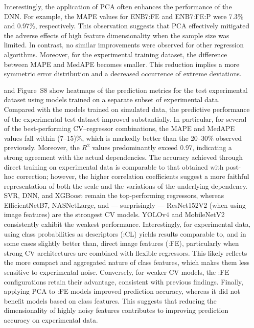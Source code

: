 \documentclass[10pt]{iopart}
\begin{document}
Interestingly, the application of PCA often enhances the performance of the DNN.
For example, the MAPE values for ENB7:FE and ENB7:FE:P were 7.3\% and 0.97\%, respectively.
This observation suggests that PCA effectively mitigated the adverse effects of high feature dimensionality
when the sample size was limited.
In contrast, no similar improvements were observed for other regression algorithms.
Moreover, for the experimental training dataset,
the difference between MAPE and MedAPE becomes smaller.
This reduction implies a more symmetric error distribution and a decreased occurrence of extreme deviations.

 and Figure~S8 show heatmaps of the prediction metrics for the test experimental dataset
using models trained on a separate subset of experimental data.
Compared with the models trained on simulated data, the predictive performance of the experimental test dataset improved substantially.
In particular, for several of the best-performing CV–regressor combinations, the MAPE and MedAPE values fall within (7–15)\%,
which is markedly better than the 20–30\% observed previously.
Moreover, the $R^2$ values predominantly exceed 0.97, indicating a strong agreement with the actual dependencies.
The accuracy achieved through direct training on experimental data is comparable to that obtained with post-hoc correction;
however, the higher correlation coefficients suggest a more faithful representation of both the scale and the variations of the underlying dependency.
SVR, DNN, and XGBoost remain the top-performing regressors,
whereas EfficientNetB7, NASNetLarge, and --- surprisingly --- ResNet152V2
(when using image features) are the strongest CV models.
YOLOv4 and MobileNetV2 consistently exhibit the weakest performance.
Interestingly, for experimental data, using class probabilities as descriptors (:CL) yields results comparable to,
and in some cases slightly better than, direct image features (:FE),
particularly when strong CV architectures are combined with flexible regressors.
This likely reflects the more compact and aggregated nature of class features,
which makes them less sensitive to experimental noise.
Conversely, for weaker CV models, the :FE configurations retain their advantage, consistent with previous findings.
Finally, applying PCA to :FE models improved prediction accuracy, whereas it did not benefit models based on class features.
This suggests that reducing the dimensionality of highly noisy features contributes to improving prediction accuracy on experimental data.
\end{document}
